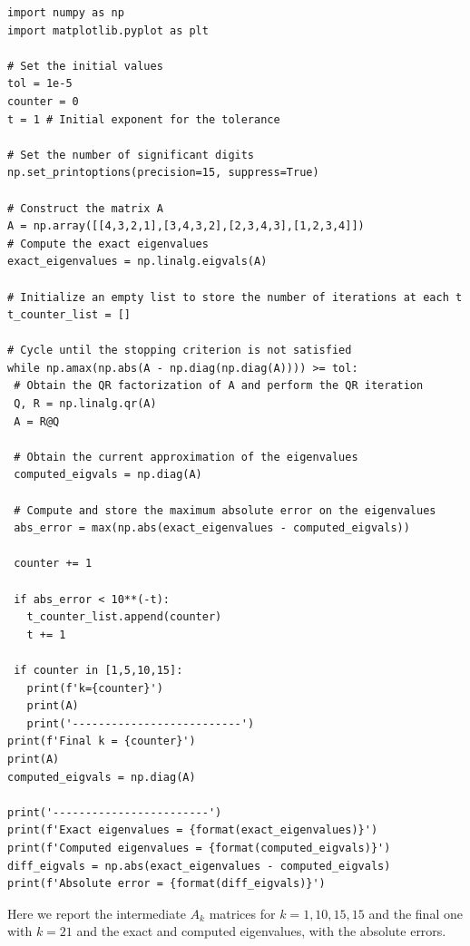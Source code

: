 \documentclass[a4paper,11pt]{article}
\begin{document}
\begin{verbatim}
import numpy as np
import matplotlib.pyplot as plt

# Set the initial values
tol = 1e-5
counter = 0
t = 1 # Initial exponent for the tolerance

# Set the number of significant digits
np.set_printoptions(precision=15, suppress=True)

# Construct the matrix A
A = np.array([[4,3,2,1],[3,4,3,2],[2,3,4,3],[1,2,3,4]])
# Compute the exact eigenvalues
exact_eigenvalues = np.linalg.eigvals(A)

# Initialize an empty list to store the number of iterations at each t
t_counter_list = []

# Cycle until the stopping criterion is not satisfied
while np.amax(np.abs(A - np.diag(np.diag(A)))) >= tol:
 # Obtain the QR factorization of A and perform the QR iteration
 Q, R = np.linalg.qr(A)
 A = R@Q

 # Obtain the current approximation of the eigenvalues
 computed_eigvals = np.diag(A)

 # Compute and store the maximum absolute error on the eigenvalues
 abs_error = max(np.abs(exact_eigenvalues - computed_eigvals))

 counter += 1

 if abs_error < 10**(-t):
   t_counter_list.append(counter)
   t += 1

 if counter in [1,5,10,15]:
   print(f'k={counter}')
   print(A)
   print('--------------------------')
print(f'Final k = {counter}')
print(A)
computed_eigvals = np.diag(A)

print('------------------------')
print(f'Exact eigenvalues = {format(exact_eigenvalues)}')
print(f'Computed eigenvalues = {format(computed_eigvals)}')
diff_eigvals = np.abs(exact_eigenvalues - computed_eigvals)
print(f'Absolute error = {format(diff_eigvals)}')
\end{verbatim}

\noindent Here we report the intermediate $A_k$ matrices for $k = 1, 10, 15, 15$ and the final one with $k = 21$ and the exact and computed eigenvalues, with the absolute errors.
\end{document}
